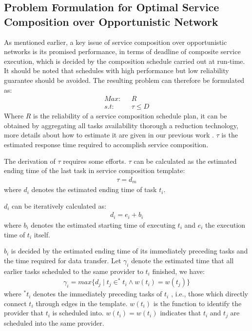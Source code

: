 \documentclass[journal]{IEEEtran}
\begin{document}
\subsection{Problem Formulation for Optimal Service Composition over Opportunistic Network}

As mentioned earlier, a key issue of service composition over opportunistic networks is its promised performance, in terms of deadline of composite service execution, which is decided by the composition schedule carried out at run-time. It should be noted that schedules with high performance but low reliability guarantee should be avoided. The resulting problem can therefore be formulated as:
\begin{align}
Max    : \ \ \ & R   \\\nonumber
s.t    : \ \ \ & \tau \le D
\end{align}
Where $R$ is the reliability of a service composition schedule plan, it can be obtained by aggregating all tasks availability thorough a reduction technology, more details about how to estimate it are given in our previous work \cite{xia2009novel}. $\tau$ is the estimated response time required to accomplish service composition. 

The derivation of $\tau$ requires some efforts. $\tau$ can be calculated as the estimated ending time of the last task in service composition template:
\begin{align}
\tau = d_m
\end{align}
where $d_i$ denotes the estimated ending time of task $t_i$.

$d_i$ can be iteratively calculated as:
\begin{align}
d_i = e_i + b_i
\end{align}
where $b_i$ denotes the estimated starting time of executing $t_i$ and $e_i$ the execution time of $t_i$ itself.

$b_i$ is decided by the estimated ending time of its immediately preceding tasks and the time required for data transfer. Let $\gamma_i$ denote the estimated time that all earlier tasks scheduled to the same provider to $t_i$ finished, we have:
\begin{align}
\gamma_i =  max\{d_j \mid t_j \in ^{*}t_i \wedge w(t_i) = w(t_j) \}
\end{align}
where $^{*}t_i$ denotes the immediately preceding tasks of $t_i$ , i.e., those which directly connect $t_i$ through edges in the template. 
$w(t_i)$ is the function to identify the provider that $t_i$ is scheduled into. $w(t_i) = w(t_i)$ indicates that $t_i$ and $t_j$ are scheduled into the same provider.
\end{document}

